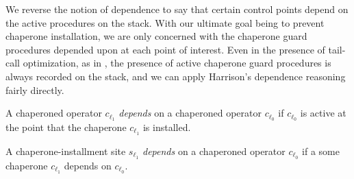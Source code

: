 We reverse the notion of dependence to say that certain control points depend on the active procedures on the stack.
With our ultimate goal being to prevent chaperone installation, we are only concerned with the chaperone guard procedures depended upon at each point of interest.
Even in the presence of tail-call optimization, as in \chapcalc, the presence of active chaperone guard procedures is always recorded on the stack, and we can apply Harrison's dependence reasoning fairly directly.



\begin{definition}
A chaperoned operator $c_{\ell_1}$ \emph{depends} on a chaperoned operator $c_{\ell_0}$ if $c_{\ell_0}$ is active at the point that the chaperone $c_{\ell_1}$ is installed.
\end{definition}


\begin{definition}
A chaperone-installment site $s_{\ell_1}$ \emph{depends} on a chaperoned operator $c_{\ell_0}$ if a some chaperone $c_{\ell_1}$ depends on $c_{\ell_0}$.
\end{definition}

